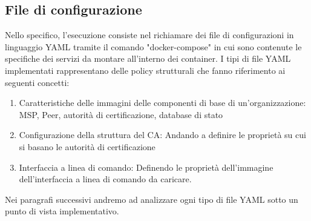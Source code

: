 \subsection{File di configurazione}
Nello specifico, l'esecuzione consiste nel richiamare dei file di configurazioni in linguaggio YAML tramite il comando "docker-compose" in cui sono contenute le specifiche dei servizi da montare all'interno dei container. 
I tipi di file YAML implementati rappresentano delle policy strutturali che fanno riferimento ai seguenti concetti:
\begin{enumerate}
    \item Caratteristiche delle immagini delle componenti di base di un'organizzazione: MSP, Peer, autorità di certificazione, database di stato
    \item Configurazione della struttura del CA: Andando a definire le proprietà su cui si basano le autorità di certificazione
    \item Interfaccia a linea di comando: Definendo le proprietà dell'immagine dell'interfaccia a linea di comando da caricare. 
\end{enumerate}
Nei paragrafi successivi andremo ad analizzare ogni tipo di file YAML sotto un punto di vista implementativo. 

